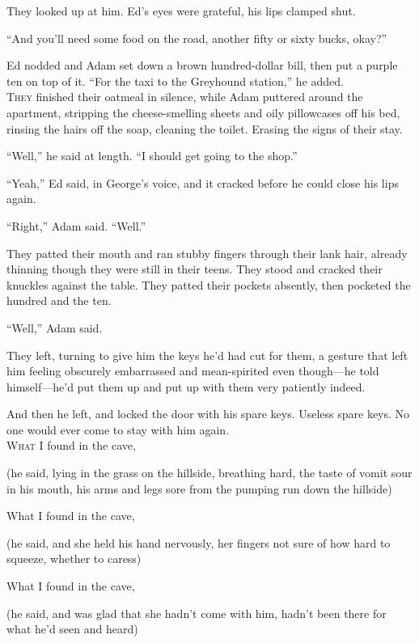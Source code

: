 \documentclass{article}
\begin{document}
They looked up at him.  Ed's eyes were grateful, his lips clamped
shut.

``And you'll need some food on the road, another fifty or sixty bucks,
okay?''

Ed nodded and Adam set down a brown hundred-dollar bill, then put a
purple ten on top of it.  ``For the taxi to the Greyhound station,''
he added.
\\
\lettrine[lines=3, lhang=.5, nindent=0pt, findent=2pt]{T}{hey} finished their oatmeal in silence, while Adam puttered around the
apartment, stripping the cheese-smelling sheets and oily pillowcases
off his bed, rinsing the hairs off the soap, cleaning the toilet. 
Erasing the signs of their stay.

``Well,'' he said at length.  ``I should get going to the shop.''

``Yeah,'' Ed said, in George's voice, and it cracked before he could
close his lips again.

``Right,'' Adam said.  ``Well.''

They patted their mouth and ran stubby fingers through their lank
hair, already thinning though they were still in their teens.  They
stood and cracked their knuckles against the table.  They patted their
pockets absently, then pocketed the hundred and the ten.

``Well,'' Adam said.

They left, turning to give him the keys he'd had cut for them, a
gesture that left him feeling obscurely embarrassed and mean-spirited
even though---he told himself---he'd put them up and put up with them
very patiently indeed.

And then he left, and locked the door with his spare keys.  Useless
spare keys.  No one would ever come to stay with him again.
\\
\lettrine[lines=3, lhang=.5, nindent=0pt, findent=2pt]{W}{hat} I found in the cave,

(he said, lying in the grass on the hillside, breathing hard, the
taste of vomit sour in his mouth, his arms and legs sore from the
pumping run down the hillside)

What I found in the cave,

(he said, and she held his hand nervously, her fingers not sure of how
hard to squeeze, whether to caress)

What I found in the cave,

(he said, and was glad that she hadn't come with him, hadn't been
there for what he'd seen and heard)
\end{document}
